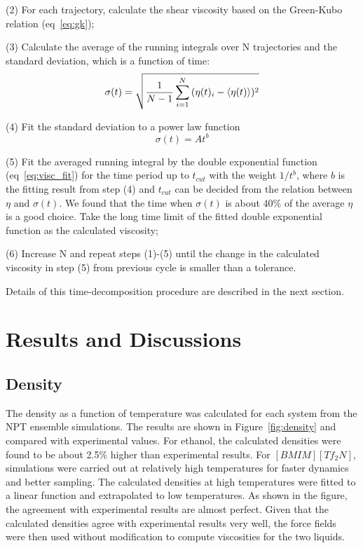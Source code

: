\documentclass[12pt]{article}
\begin{document}
(2) For each trajectory, calculate the shear viscosity based on the Green-Kubo relation (eq~\ref{eq:gk});

(3) Calculate the average of the running integrals over N trajectories and the standard deviation,
which is a function of time:
\begin{equation}
{\sigma(t) = \sqrt{ {1 \over {N-1}} \sum_{i=1}^{N} {(\eta(t)_i - \langle \eta(t) \rangle)^2} } }
\label{eq:std_err}
\end{equation}

(4) Fit the standard deviation to a power law function
\begin{equation}
{\sigma(t)=At^b}
\label{eq:power}
\end{equation}

(5) Fit the averaged running integral by the double exponential function (eq~\ref{eq:visc_fit}) 
for the time period up to $t_{cut}$ with the weight $1/t^b$,
where $b$ is the fitting result from step (4) and $t_{cut}$ can be decided from the relation between $\eta$ and $\sigma(t)$.
We found that the time when $\sigma(t)$ is about 40\% of the average $\eta$ is a good choice. 
Take the long time limit of the fitted double exponential function as the calculated viscosity;

(6) Increase N and repeat steps (1)-(5) until the change in the calculated viscosity in step (5) from previous cycle is smaller than a tolerance.

Details of this time-decomposition procedure are described in the next section.

\section{Results and Discussions}

\subsection{Density}

The density as a function of temperature was calculated for each system from the NPT ensemble simulations.
The results are shown in Figure~\ref{fig:density} and compared with experimental values.
For ethanol, the calculated densities were found to be about 2.5\% higher than experimental results.
For $[BMIM][Tf_2N]$, 
simulations were carried out at relatively high temperatures for faster dynamics and better sampling.
The calculated densities at high temperatures were fitted to a linear function and extrapolated to low temperatures.
As shown in the figure, 
the agreement with experimental results are almost perfect.
Given that the calculated densities agree with experimental results very well, the force fields were then used without modification to compute viscosities for the two liquids. 
\end{document}
